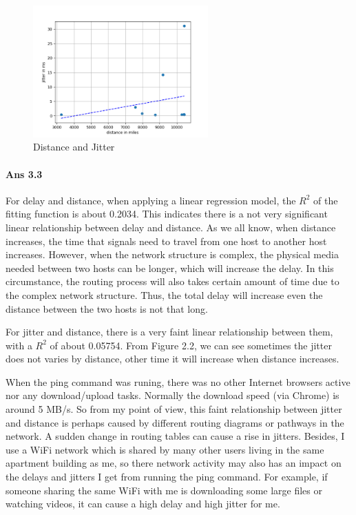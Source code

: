 \documentclass[paper=a4, fontsize=10pt]{scrartcl} %
\numberwithin{equation}{section} %
\numberwithin{figure}{section} %
\numberwithin{table}{section} %
\begin{document}
\begin{figure}[htbp!]
    \centering
    \includegraphics[width=0.6\textwidth]{distance_jitter_fit_linear.png}
    \caption{Distance and Jitter}%
    \vspace{-1em}
\end{figure}
\newpage
\paragraph{Ans 3.3}
For delay and distance, when applying a linear regression model, the $R^2$ of the fitting function is about 0.2034. This indicates there is a not very significant linear relationship between delay and distance. As we all know, when distance increases, the time that signals need to travel from one host to another host increases. However, when the network structure is complex, the physical media needed between two hosts can be longer, which will increase the delay. In this circumstance, the routing process will also takes certain amount of time due to the complex network structure. Thus, the total delay will increase even the distance between the two hosts is not that long.

For jitter and distance, there is a very faint linear relationship between them, with a $R^2$ of about 0.05754. From Figure 2.2, we can see sometimes the jitter does not varies by distance, other time it will increase when distance increases. 

When the ping command was runing, there was no other Internet browsers active nor any download/upload tasks. Normally the download speed (via Chrome) is around 5 MB/s. So from my point of view, this faint relationship between jitter and distance is perhaps caused by different routing diagrams or pathways in the network. A sudden change in routing tables can cause a rise in jitters. Besides, I use a WiFi network which is shared by many other users living in the same apartment building as me, so there network activity may also has an impact on the delays and jitters I get from running the ping command. For example, if someone sharing the same WiFi with me is downloading some large files or watching videos, it can cause a high delay and high jitter for me.
\end{document}

